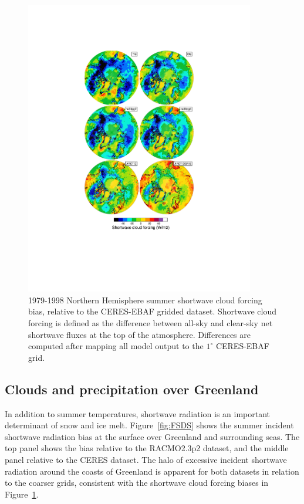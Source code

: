\documentclass[draft]{agujournal2019}
\begin{document}
\begin{figure}[t]
\begin{center}
         \includegraphics[width=100mm]{figs/temp_contours_diffCERES_SWCF.pdf}
\end{center}
\caption{1979-1998 Northern Hemisphere summer shortwave cloud forcing bias, relative to the CERES-EBAF gridded dataset. Shortwave cloud forcing is defined as the difference between all-sky and clear-sky net shortwave fluxes at the top of the atmosphere. Differences are computed after mapping all model output to the $1^{\circ}$ CERES-EBAF grid.}
\label{fig:SWCF}
\end{figure}

\subsection{Clouds and precipitation over Greenland}

In addition to summer temperatures, shortwave radiation is an important determinant of snow and ice melt. Figure~\ref{fig:FSDS} shows the summer incident shortwave radiation bias at the surface over Greenland and surrounding seas. The top panel shows the bias relative to the RACMO2.3p2 dataset, and the middle panel relative to the CERES dataset. The halo of excessive incident shortwave radiation around the coasts of Greenland is apparent for both datasets in relation to the coarser grids, consistent with the shortwave cloud forcing biases in Figure~\ref{fig:SWCF}.
\end{document}
